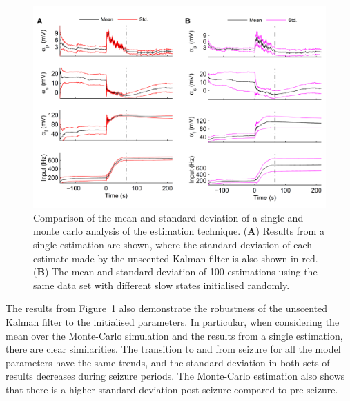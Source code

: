 \begin{figure}[ht]
	\centering
		\includegraphics{fig/MonteResults.pdf}
	\caption{Comparison of the mean and standard deviation of a single and monte carlo analysis of the estimation technique. (\textbf{A}) Results from a single estimation are shown, where the standard deviation of each estimate made by the unscented Kalman filter is also shown in red. (\textbf{B}) The mean and standard deviation of 100 estimations using the same data set with different slow states initialised randomly.}
	\label{fig: MonteResults}
\end{figure}

The results from Figure~\ref{fig: MonteResults} also demonstrate the robustness of the unscented Kalman filter to the initialised parameters. In particular, when considering the mean over the Monte-Carlo simulation and the results from a single estimation, there are clear similarities. The transition to and from seizure for all the model parameters have the same trends, and the standard deviation in both sets of results decreases during seizure periods. The Monte-Carlo estimation also shows that there is a higher standard deviation post seizure compared to pre-seizure.
 